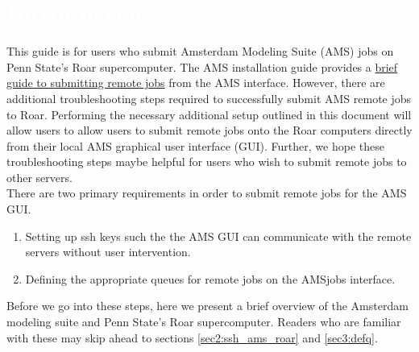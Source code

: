 \section{\textcolor{white}{Introduction}\label{sec:intro}}

This guide is for users who submit Amsterdam Modeling Suite (AMS) jobs on Penn State's Roar supercomputer. 
The AMS installation guide provides a \href{https://www.scm.com/doc/GUI/Set_up.html#running-remotely}{brief guide to submitting remote jobs} from the AMS interface.
However, there are additional troubleshooting steps required to successfully submit AMS remote jobs to Roar. 
Performing the necessary additional setup outlined in this document will allow users to allow users to submit remote jobs onto the Roar computers directly from their local AMS graphical user interface (GUI). 
Further, we hope these troubleshooting steps maybe helpful for users who wish to submit remote jobs to other servers. \\
There are two primary requirements in order to submit remote jobs for the AMS GUI.
\begin{enumerate}
    \item Setting up ssh keys such the the AMS GUI can communicate with the remote servers without user intervention.
    \item Defining the appropriate queues for remote jobs on the AMSjobs interface.
\end{enumerate}
Before we go into these steps, here we present a brief overview of the Amsterdam modeling suite and Penn State's Roar supercomputer. 
Readers who are familiar with these may skip ahead to sections \ref{sec2:ssh_ams_roar} and \ref{sec3:defq}.

